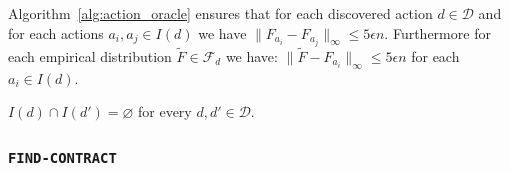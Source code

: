 \begin{lemma}
	 Algorithm~\ref{alg:action_oracle} ensures that for each discovered action $d \in \mathcal{D}$ and for each actions $a_i, a_j \in I(d)$ we have $\| F_{a_i} -   F_{a_j} \|_{\infty} \le 5 \epsilon n$. Furthermore for each empirical distribution $\widetilde{F} \in \mathcal{F}_{d}$ we have: $\|\widetilde{F}- F_{a_i} \|_{\infty} \le 5 \epsilon n $ for each  $a_i \in I(d)$.
\end{lemma}

\begin{lemma}
	$I(d) \cap I(d') = \varnothing$ for every $d,d' \in \mathcal{D}$.
\end{lemma}

\subsubsection*{\texttt{FIND-CONTRACT}}

\begin{lemma}
	
\end{lemma}

\hrulefill












